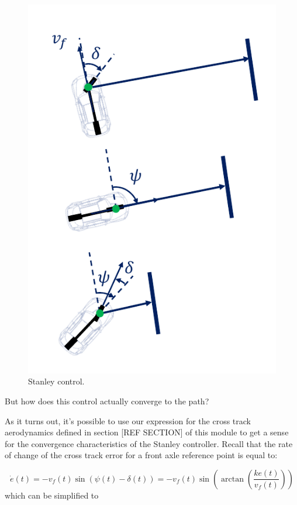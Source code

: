 \begin{figure}[!htb]
\begin{center}
\includegraphics[scale=0.280]{img/lateral_control/stanley_control_3.jpeg}
\end{center}
\caption{Stanley control.}
\label{stanley_control_3}
\end{figure}

But how does this control actually converge to the path? 

As it turns out, it's possible to use our expression for the cross track aerodynamics defined in section [REF SECTION] of this module to get a sense for the convergence characteristics of the Stanley controller. Recall that the rate of change of the cross track error for a front axle reference point is equal to:

\begin{equation}
\dot{e}(t) = -v_f(t)\sin(\psi(t)-\delta(t)) = -v_f(t)\sin(\arctan(\frac{ke(t)}{v_f(t)}))
\end{equation}
which can be simplified to

